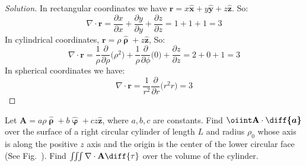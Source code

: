 \documentclass[crop=false,class=article,oneside]{standalone}
\begin{document}
        \begin{proof}[Solution]
            In rectangular coordinates we have
            $\mathbf{r}%
             =x\hat{\mathbf{x}}%
             +y\hat{\mathbf{y}}%
             +z\hat{\mathbf{z}}$.
            So:
            \begin{equation*}
                \nabla\cdot\mathbf{r}
                =\frac{\partial x}{\partial x}
                +\frac{\partial y}{\partial y}
                +\frac{\partial z}{\partial z}
                =1+1+1
                =3
            \end{equation*}
            In cylindrical coordinates,
            $\mathbf{r}%
             =\rho\hat{\boldsymbol{\uprho}}%
             +z\hat{\mathbf{z}}$,
            So:
            \begin{equation*}
                \nabla\cdot\mathbf{r}
                =\frac{1}{\rho}
                \frac{\partial}{\partial\rho}
                \big(\rho^2\big)
                +\frac{1}{\rho}
                \frac{\partial}{\partial\phi}
                \big(0\big)
                +\frac{\partial z}{\partial z}
                =2+0+1
                =3
            \end{equation*}
            In spherical coordinates we have:
            \begin{equation*}
                \nabla\cdot\mathbf{r}
                =\frac{1}{r^{2}}
                \frac{\partial}{\partial{r}}
                \big(r^{2}r\big)
                =3
            \end{equation*}
        \end{proof}
        \begin{problem}[Wangsness 1-22]
        \label{problem:EMAG_wangsness_1_22}
            Let
            $\mathbf{A}%
             =a\rho\hat{\boldsymbol{\uprho}}%
             +b\hat{\boldsymbol{\upvarphi}}%
             +cz\hat{\mathbf{z}}$,
            where $a,b,c$ are constants.
            Find $\oiint\mathbf{A}\cdot\boldsymbol{\diff{a}}$
            over the surface of a right circular cylinder of length
            $L$ and radius $\rho_{0}$ whose axis is along the
            positive $z$ axis and the origin is the center
            of the lower circular face
            (See Fig.~).
            Find $\iiint\nabla\cdot\mathbf{A}\diff{\tau}$
            over the volume of the cylinder.
        \end{problem}
\end{document}
